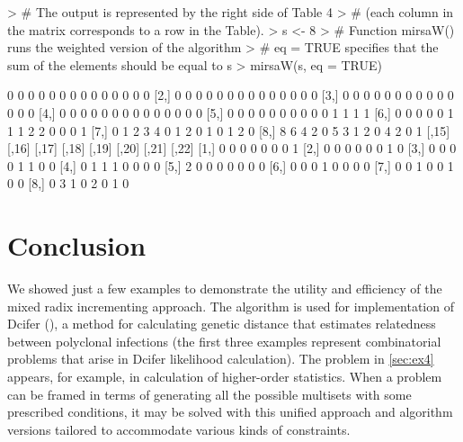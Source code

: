 \documentclass[12pt]{article}
\begin{document}
\begin{Schunk}
\begin{Sinput}
> # The output is represented by the right side of Table 4
> # (each column in the matrix corresponds to a row in the Table).
> s <- 8
> # Function mirsaW() runs the weighted version of the algorithm 
> # eq = TRUE specifies that the sum of the elements should be equal to s 
> mirsaW(s, eq = TRUE)  
\end{Sinput}
\begin{Soutput}
     [,1] [,2] [,3] [,4] [,5] [,6] [,7] [,8] [,9] [,10] [,11] [,12] [,13] [,14]
[1,]    0    0    0    0    0    0    0    0    0     0     0     0     0     0
[2,]    0    0    0    0    0    0    0    0    0     0     0     0     0     0
[3,]    0    0    0    0    0    0    0    0    0     0     0     0     0     0
[4,]    0    0    0    0    0    0    0    0    0     0     0     0     0     0
[5,]    0    0    0    0    0    0    0    0    0     0     1     1     1     1
[6,]    0    0    0    0    0    1    1    1    2     2     0     0     0     1
[7,]    0    1    2    3    4    0    1    2    0     1     0     1     2     0
[8,]    8    6    4    2    0    5    3    1    2     0     4     2     0     1
     [,15] [,16] [,17] [,18] [,19] [,20] [,21] [,22]
[1,]     0     0     0     0     0     0     0     1
[2,]     0     0     0     0     0     0     1     0
[3,]     0     0     0     0     1     1     0     0
[4,]     0     1     1     1     0     0     0     0
[5,]     2     0     0     0     0     0     0     0
[6,]     0     0     0     1     0     0     0     0
[7,]     0     0     1     0     0     1     0     0
[8,]     0     3     1     0     2     0     1     0
\end{Soutput}
\end{Schunk}

\section{Conclusion}

We showed just a few examples to demonstrate the utility and efficiency of the mixed radix incrementing approach. The algorithm is used for implementation of Dcifer (\cite{gerlovina2022dcifer}), a method for calculating genetic distance that estimates relatedness between polyclonal infections (the first three examples represent combinatorial problems that arise in Dcifer likelihood calculation). The problem in \ref{sec:ex4} appears, for example, in calculation of higher-order statistics. When a problem can be framed in terms of generating all the possible multisets with some prescribed conditions, it may be solved with this unified approach and algorithm versions tailored to accommodate various kinds of constraints. 


%

\end{document}

